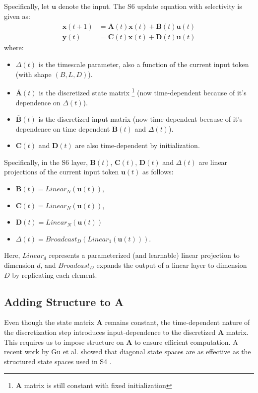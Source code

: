 \documentclass[12pt,a4paper]{report}
\begin{document}
Specifically, let $\mathbf{u}$ denote the input. The S6 update equation with selectivity is given as:
\[
\begin{aligned}
\mathbf{x}(t+1) &= \mathbf{\overline{A}}(t) \mathbf{x}(t) + \mathbf{\overline{B}}(t) \mathbf{u}(t) \\
\mathbf{y}(t) &= \mathbf{C}(t) \mathbf{x}(t) + \mathbf{D}(t) \mathbf{u}(t)
\end{aligned}
\]
where:
\begin{itemize}
    \item $\Delta(t)$ is the timescale parameter, also a function of the current input token (with shape $(B, L, D)$).
    \item $\mathbf{\overline{A}}(t)$ is the discretized state matrix \footnote{$\mathbf{A}$ matrix is still constant with fixed initialization} (now time-dependent because of it's dependence on $\Delta(t)$).
    \item $\mathbf{\overline{B}}(t)$ is the discretized input matrix (now time-dependent because of it's dependence on time dependent $\mathbf{B}(t)$ and $\Delta(t)$).
    \item $\mathbf{C}(t)$ and $\mathbf{D}(t)$ are also time-dependent by initialization.
\end{itemize}

Specifically, in the S6 layer, $\mathbf{B}(t)$, $\mathbf{C}(t)$, $\mathbf{D}(t)$ and $\Delta(t)$ are linear projections of the current input token $\mathbf{u}(t)$ as follows:
\begin{itemize}
    \item $\mathbf{B}(t) = Linear_N(\mathbf{u}(t))$,
    \item $\mathbf{C}(t) = Linear_N(\mathbf{u}(t))$,
    \item $\mathbf{D}(t) = Linear_N(\mathbf{u}(t))$
    \item $\Delta(t) = Broadcast_D(Linear_1(\mathbf{u}(t)))$.
\end{itemize}

Here, $Linear_d$ represents a parameterized (and learnable) linear projection to dimension $d$, and $Broadcast_D$ expands the output of a linear layer to dimension $D$ by replicating each element.

\subsection{Adding Structure to A}
Even though the state matrix $\mathbf{A}$ remains constant, the time-dependent nature of the discretization step introduces input-dependence to the discretized $\mathbf{A}$ matrix. This requires us to impose structure on $\mathbf{A}$ to ensure efficient computation. A recent work by Gu et al. \cite{dssm} showed that diagonal state spaces are as effective as the structured state spaces used in S4 \cite{s4}.
\end{document}
